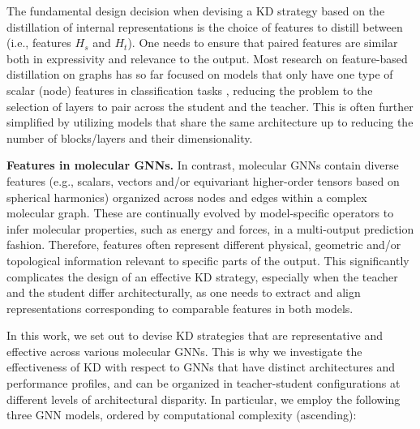 \documentclass{article}
\begin{document}
The fundamental design decision when devising a KD strategy based on the distillation of internal representations is the choice of features to distill between (i.e., features $H_s$ and $H_t$). One needs to ensure that paired features are similar both in expressivity and relevance to the output. Most research on feature-based distillation on graphs has so far focused on models that only have one type of scalar (node) features in classification tasks \cite{tian2023knowledge, liu2023graph}, reducing the problem to the selection of layers to pair across the student and the teacher. This is often further simplified by utilizing models that share the same architecture up to reducing the number of blocks/layers and their dimensionality.

\textbf{Features in molecular GNNs.} 
In contrast, molecular GNNs contain diverse features (e.g., scalars, vectors and/or equivariant higher-order tensors based on spherical harmonics) organized across nodes and edges within a complex molecular graph. These are continually evolved by model-specific operators to infer molecular properties, such as energy and forces, in a multi-output prediction fashion. Therefore, features often represent different physical, geometric and/or topological information relevant to specific parts of the output. This significantly complicates the design of an effective KD strategy, especially when the teacher and the student differ architecturally, as one needs to extract and align representations corresponding to comparable features in both models.

In this work, we set out to devise KD strategies that are representative and effective across various molecular GNNs. This is why we investigate the effectiveness of KD with respect to GNNs that have distinct architectures and performance profiles, and can be organized in teacher-student configurations at different levels of architectural disparity. In particular, we employ the following three GNN models, ordered by computational complexity (ascending):
\end{document}

